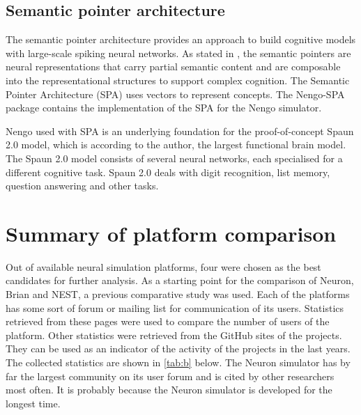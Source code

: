 \subsection{Semantic pointer architecture}
The semantic pointer architecture provides an approach to build cognitive models with large-scale spiking neural networks. As stated in \cite{eliasmithHowBuild13}, the semantic pointers are neural representations that carry partial semantic content and are composable into the representational structures to support complex cognition. The Semantic Pointer Architecture (SPA) uses vectors to represent concepts. The Nengo-SPA package contains the implementation of the SPA for the Nengo simulator. \par
Nengo used with SPA is an underlying foundation for the proof-of-concept Spaun 2.0 \cite{chooSpaunExtending18} model, which is according to the author, the largest functional brain model. The Spaun 2.0 model consists of several neural networks, each specialised for a different cognitive task. Spaun 2.0 deals with digit recognition, list memory, question answering and other tasks.

\section{Summary of platform comparison}
Out of available neural simulation platforms, four were chosen as the best candidates for further analysis. As a starting point for the comparison of Neuron, Brian and NEST, a previous comparative study \cite{tikidji-hamburyanSoftwareBrainNetwork2017} was used. Each of the platforms has some sort of forum or mailing list for communication of its users. Statistics retrieved from these pages were used to compare the number of users of the platform. Other statistics were retrieved from the GitHub sites of the projects. They can be used as an indicator of the activity of the projects in the last years. The collected statistics are shown in \cref{tab:b} below. The Neuron simulator has by far the largest community on its user forum and is cited by other researchers most often. It is probably because the Neuron simulator is developed for the longest time. \par

